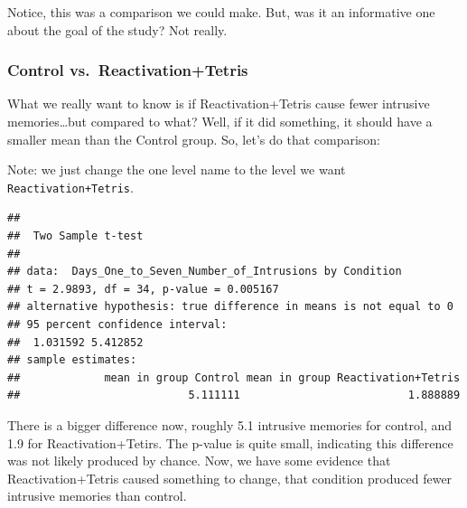 \documentclass[]{book}
\newenvironment{Shaded}{\begin{snugshade}}{\end{snugshade}}
\newcommand{\KeywordTok}[1]{\textcolor[rgb]{0.13,0.29,0.53}{\textbf{{#1}}}}
\newcommand{\DataTypeTok}[1]{\textcolor[rgb]{0.13,0.29,0.53}{{#1}}}
\newcommand{\StringTok}[1]{\textcolor[rgb]{0.31,0.60,0.02}{{#1}}}
\newcommand{\OtherTok}[1]{\textcolor[rgb]{0.56,0.35,0.01}{{#1}}}
\newcommand{\NormalTok}[1]{{#1}}
\theoremstyle{definition}
\theoremstyle{definition}
\theoremstyle{definition}
\theoremstyle{remark}
\begin{document}
Notice, this was a comparison we could make. But, was it an informative
one about the goal of the study? Not really.

\subsubsection{Control
vs.~Reactivation+Tetris}\label{control-vs.reactivationtetris}

What we really want to know is if Reactivation+Tetris cause fewer
intrusive memories\ldots{}but compared to what? Well, if it did
something, it should have a smaller mean than the Control group. So,
let's do that comparison:

Note: we just change the one level name to the level we want
\texttt{Reactivation+Tetris}.

\begin{Shaded}
\end{Shaded}

\begin{verbatim}
## 
##  Two Sample t-test
## 
## data:  Days_One_to_Seven_Number_of_Intrusions by Condition
## t = 2.9893, df = 34, p-value = 0.005167
## alternative hypothesis: true difference in means is not equal to 0
## 95 percent confidence interval:
##  1.031592 5.412852
## sample estimates:
##             mean in group Control mean in group Reactivation+Tetris 
##                          5.111111                          1.888889
\end{verbatim}

There is a bigger difference now, roughly 5.1 intrusive memories for
control, and 1.9 for Reactivation+Tetirs. The p-value is quite small,
indicating this difference was not likely produced by chance. Now, we
have some evidence that Reactivation+Tetris caused something to change,
that condition produced fewer intrusive memories than control.
\end{document}
